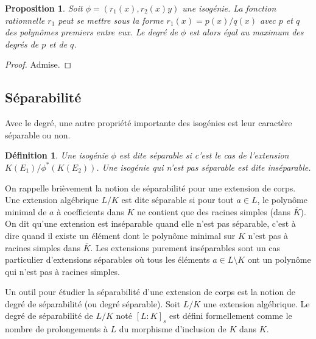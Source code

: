 \documentclass{article}
\theoremstyle{plain}%
\newtheorem{prop}[thm]{Proposition}
\newtheorem{deff}[thm]{Définition}
\theoremstyle{definition}%
\begin{document}
\begin{prop}
  \label{caracdeg}
  Soit $\phi = (r_1(x), r_2(x)y)$ une isogénie. La fonction rationnelle $r_1$ peut se mettre sous la forme $r_1(x) = p(x) / q(x)$ avec $p$ et $q$ des polynômes premiers entre eux. Le degré de $\phi$ est alors égal au maximum des degrés de $p$ et de $q$. 
\end{prop}

\begin{proof}
  Admise. 
\end{proof}

\subsection{Séparabilité}

Avec le degré, une autre propriété importante des isogénies est leur caractère séparable ou non.

\begin{deff}
  Une isogénie $\phi$ est dite séparable si c'est le cas de l'extension $K(E_1) / \phi^*(K(E_2))$. Une isogénie qui n'est pas séparable est dite inséparable.
\end{deff}

On rappelle brièvement la notion de séparabilité pour une extension de corps. Une extension algébrique $L/K$ est dite séparable si pour tout $a\in L$, le polynôme minimal de $a$ à coefficients dans $K$ ne contient que des racines simples (dans $\overline{K}$). On dit qu'une extension est inséparable quand elle n'est pas séparable, c'est à dire quand il existe un élément dont le polynôme minimal sur $K$ n'est pas à racines simples dans $\overline{K}$. Les extensions purement inséparables sont un cas particulier d'extensions séparables où tous les éléments $a\in L \setminus K$ ont un polynôme qui n'est pas à racines simples.

Un outil pour étudier la séparabilité d’une extension de corps est la notion de degré de séparabilité (ou
degré séparable). Soit $L/K$ une extension algébrique. Le degré de séparabilité de $L/K$ noté  $[L : K]_s$ est défini
formellement comme le nombre de prolongements à $L$ du morphisme d’inclusion de $K$ dans $K$. 
\end{document}
